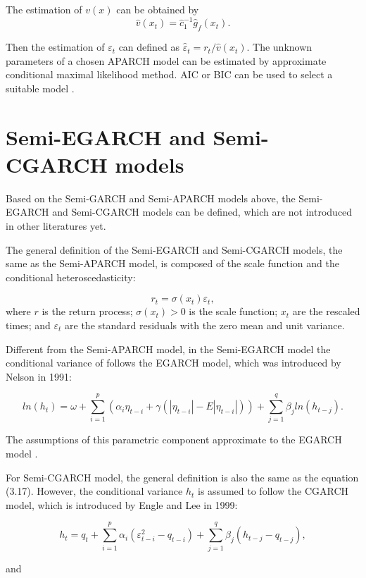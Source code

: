 The estimation of $v(x)$ can be obtained by
\[\hat{v}(x_t)=\hat{c}_1^{-1}\hat{g}_f(x_t).\]

Then the estimation of $\varepsilon_t$ can defined as $\hat{\varepsilon}_t=r_t/\hat{v}(x_t)$. The unknown parameters of a chosen APARCH model can be estimated by approximate conditional maximal likelihood method. AIC or BIC can be used to select a suitable model \citep{FengYuanhua;Sun2013}.

\section{Semi-EGARCH and Semi-CGARCH models}
Based on the Semi-GARCH and Semi-APARCH models above, the Semi-EGARCH and Semi-CGARCH models can be defined, which are not introduced in other literatures yet.

The general definition of the Semi-EGARCH and Semi-CGARCH models, the same as the Semi-APARCH model, is composed of the scale function and the conditional heteroscedasticity:

\begin{equation}
r_{t} = \sigma(x_{t})\varepsilon_{t},
\end{equation}
where $r$ is the return process; $\sigma(x_{t})>0$ is the scale function; $x_{t}$ are the rescaled times; and $\varepsilon_{t}$ are the standard residuals with the zero mean and unit variance. 

Different from the Semi-APARCH model, in the Semi-EGARCH model the conditional variance of  follows the EGARCH model, which was introduced by Nelson in 1991:

\begin{equation}
ln(h_t) =\omega + \sum_{i=1}^p(\alpha_i\eta_{t-i}+\gamma(|\eta_{t-i}|-E|\eta_{t-i}|))+\sum_{j=1}^q\beta_jln(h_{t-j}).
\end{equation}

The assumptions of this parametric component approximate to the EGARCH model \citep{Nelson1991}.

For Semi-CGARCH model, the general definition is also the same as the equation (3.17). However, the conditional variance $h_t$ is assumed to follow the CGARCH model, which is introduced by Engle and Lee in 1999:

\begin{equation}
h_{t}=q_{t}+\sum_{i=1}^{p}\alpha_{i}(\varepsilon_{t-i}^{2}-q_{t-i}) + \sum_{j=1}^{q}\beta_{j}(h_{t-j}-q_{t-j}),
\end{equation}

and

